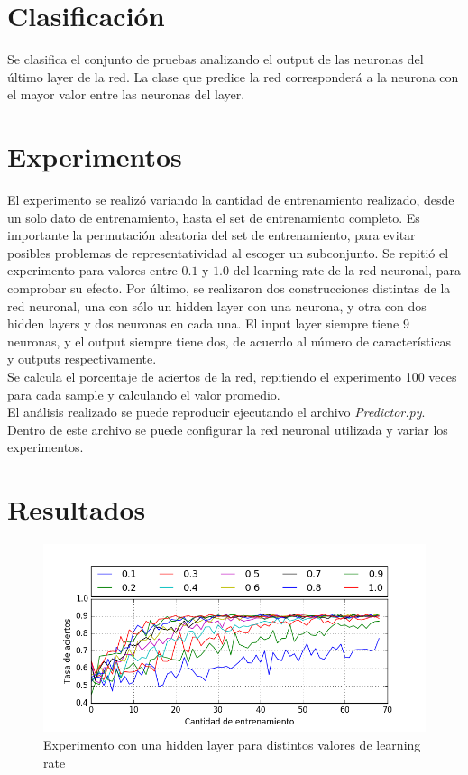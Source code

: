 \documentclass[11pt,letterpaper]{article}
\begin{document}
\section{Clasificación}
Se clasifica el conjunto de pruebas analizando el output de las neuronas del último
layer de la red. La clase que predice la red corresponderá a la neurona con
el mayor valor entre las neuronas del layer.

\section{Experimentos}
El experimento se realizó variando la cantidad de entrenamiento realizado, desde
un solo dato de entrenamiento, hasta el set de entrenamiento completo.
Es importante la permutación aleatoria del set de entrenamiento, para evitar
posibles problemas de representatividad al escoger un subconjunto.
Se repitió el experimento para valores entre $0.1$ y $1.0$ del learning rate de la red neuronal, para
comprobar su efecto. Por último, se realizaron dos construcciones distintas de la
red neuronal, una con sólo un hidden layer con una neurona, y otra con dos hidden layers
y dos neuronas en cada una. El input layer siempre tiene 9 neuronas, y el output
siempre tiene dos, de acuerdo al número de características y outputs respectivamente.\\

Se calcula el porcentaje de aciertos de la red, repitiendo el experimento 100 veces
para cada sample y calculando el valor promedio.\\

El análisis realizado se puede reproducir ejecutando el archivo \textit{Predictor.py}.
Dentro de este archivo se puede configurar la red neuronal utilizada y variar
los experimentos.

\section{Resultados}

\begin{figure}[ht!]
\centering \includegraphics[width=\textwidth]{img/exp1.png}
\caption{Experimento con una hidden layer para distintos valores de learning rate} \label{img1}
\end{figure}
\end{document}
